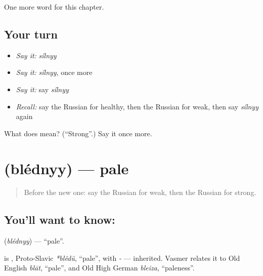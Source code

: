 \begin{grammarlens}[title={What you've built}]
One more word for this chapter.
\end{grammarlens}

\subsection*{Your turn}
\begin{itemize}
\raggedright
  \item \emph{Say it:} \emph{sílnyy}
  \item \emph{Say it:} \emph{sílnyy}, once more
  \item \emph{Say it:} say \emph{sílnyy}
  \item \emph{Recall:} say the Russian for healthy, then the Russian for weak, then say \emph{sílnyy} again
\end{itemize}

\begin{tcolorbox}[breakable,colback=teal!4,colframe=teal!35!black,title={Before you move on}]
What does  mean? (\textquotedblleft{}Strong\textquotedblright{}.) Say it once more.
\end{tcolorbox}
\section[\texorpdfstring{\ru{бледный} (blédnyy)}{бледный (blédnyy)}]{ (blédnyy) — pale}

\label{lesson:RU-C148-blednyy}



\begin{quote}
Before the new one: say the Russian for weak, then the Russian for strong.
\end{quote}

\subsection*{You'll want to know: }
\textbf{} (\emph{blédnyy}) — \textquotedblleft{}pale\textquotedblright{}.

\begin{cousinweb}
\textbf{} is \emph{}, Proto-Slavic \emph{*blědŭ}, \textquotedblleft{}pale\textquotedblright{}, with \emph{-} — inherited. Vasmer relates it to Old English \emph{blāt}, \textquotedblleft{}pale\textquotedblright{}, and Old High German \emph{bleiza}, \textquotedblleft{}paleness\textquotedblright{}.
\end{cousinweb}

